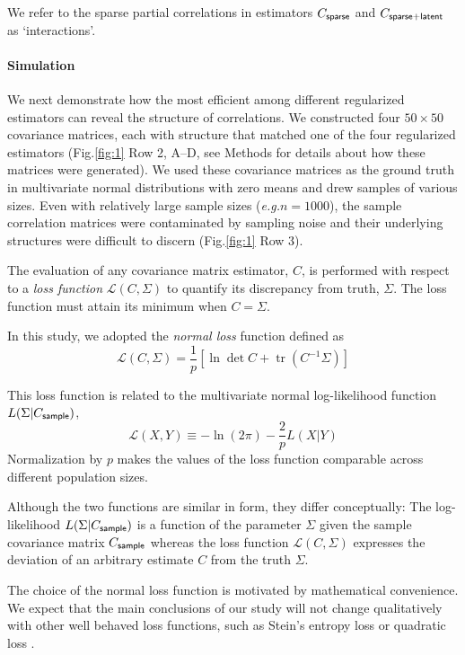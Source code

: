 \documentclass[10pt]{article}
\DeclareMathOperator{\Tr}{tr}
\newcommand{\sq}[1]{\lq#1\rq}
\newcommand{\figref}[2]{Fig.\;\ref{fig:#1}\,#2}
\newcommand{\loss}[1]{\mathcal L\left(#1\right)}
\newcommand{\eg}{\emph{e.g.}\;}
\begin{document}
We refer to the sparse partial correlations in estimators $C_{\sf sparse}$ and $C_{\sf sparse+latent}$ as \sq{interactions}.

\paragraph{Simulation}
We next demonstrate how the most efficient among different regularized estimators can reveal the structure of correlations.
We constructed four $50\times 50$ covariance matrices, each with structure that matched one of the four regularized estimators (\figref{1}{\,Row 2, A--D}, see Methods for details about how these matrices were generated).  We used these covariance matrices as the ground truth in multivariate normal distributions with zero means and drew samples of various sizes. Even with relatively large sample sizes (\eg $n=1000$), the sample correlation matrices were contaminated by sampling noise and their underlying structures were difficult to discern (\figref{1}{\,Row 3}). 

The evaluation of any covariance matrix estimator, $C$, is performed with respect to a \emph{loss function} $\loss{C,\Sigma}$ to quantify its discrepancy from truth, $\Sigma$.  The loss function must attain its minimum when $C=\Sigma$.

In this study, we adopted the \emph{normal loss} function defined as
\begin{equation}\label{eq:loss}
    \loss{C,\Sigma} = \frac 1 p\left[\ln \det C + \Tr(C^{-1}\Sigma)\right]
\end{equation}

This loss function is related to the multivariate normal log-likelihood function $L(\Sigma|C_{\sf sample})$,
\begin{equation}
     \loss{X,Y} \equiv -\ln(2\pi) - \frac 2 p L(X|Y)
\end{equation}
Normalization by $p$ makes the values of the loss function comparable across different population sizes. 

Although the two functions are similar in form, they differ conceptually: The log-likelihood $L(\Sigma|C_{\sf sample})$ is a function of the parameter $\Sigma$ given the sample covariance matrix $C_{\sf sample}$ whereas the loss function $\loss{C,\Sigma}$ expresses the deviation of an arbitrary estimate $C$ from the truth $\Sigma$.

The choice of the normal loss function is motivated by mathematical convenience. We expect that the main conclusions of our study will not change qualitatively with other well behaved loss functions, such as Stein's entropy loss or quadratic loss \cite{James:1961, Fan:2008, Ledoit:2004, Schafer:2005}.  
\end{document}
